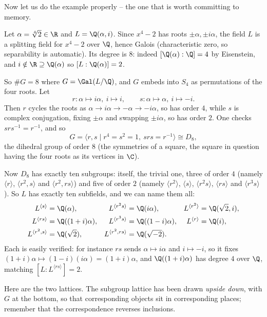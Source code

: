 Now let us do the example properly -- the one that is worth committing to memory.

\begin{example}\label{ex:biglattice}
	Let $\alpha = \sqrt[4]{2} \in \R$ and $L = \Q(\alpha, i)$. Since $x^4 - 2$ has roots $\pm\alpha, \pm i\alpha$, the field $L$ is a splitting field for $x^4-2$ over $\Q$, hence Galois (characteristic zero, so separability is automatic). Its degree is $8$: indeed $[\Q(\alpha):\Q] = 4$ by Eisenstein, and $i \notin \R \supseteq \Q(\alpha)$ so $[L:\Q(\alpha)] = 2$.

	So $\#G = 8$ where $G = \Gal(L/\Q)$, and $G$ embeds into $S_4$ as permutations of the four roots. Let
	$$r : \alpha \mapsto i\alpha,\ i \mapsto i, \qquad s : \alpha\mapsto\alpha,\ i \mapsto -i.$$
	Then $r$ cycles the roots as $\alpha \to i\alpha \to -\alpha \to -i\alpha$, so has order $4$, while $s$ is complex conjugation, fixing $\pm\alpha$ and swapping $\pm i\alpha$, so has order $2$. One checks $srs^{-1} = r^{-1}$, and so
	$$G = \langle r, s \mid r^4 = s^2 = 1,\ srs = r^{-1}\rangle \cong D_8,$$
	the dihedral group of order $8$ (the symmetries of a square, the square in question having the four roots as its vertices in $\C$).

	Now $D_8$ has exactly ten subgroups: itself, the trivial one, three of order $4$ (namely $\langle r\rangle$, $\langle r^2, s\rangle$ and $\langle r^2, rs\rangle$) and five of order $2$ (namely $\langle r^2\rangle$, $\langle s\rangle$, $\langle r^2s\rangle$, $\langle rs\rangle$ and $\langle r^3 s\rangle$). So $L$ has exactly ten subfields, and we can name them all:
	\begin{align*}
		L^{\langle s\rangle} &= \Q(\alpha), & L^{\langle r^2s\rangle} &= \Q(i\alpha), & L^{\langle r^2\rangle} &= \Q(\sqrt2, i),\\
		L^{\langle rs\rangle} &= \Q((1+i)\alpha), & L^{\langle r^3s\rangle} &= \Q((1-i)\alpha), & L^{\langle r\rangle} &= \Q(i),\\
		L^{\langle r^2,s\rangle} &= \Q(\sqrt 2), & L^{\langle r^2, rs\rangle} &= \Q(\sqrt{-2}). &&
	\end{align*}
	Each is easily verified: for instance $rs$ sends $\alpha \mapsto i\alpha$ and $i \mapsto -i$, so it fixes $(1+i)\alpha \mapsto (1-i)(i\alpha) = (1+i)\alpha$, and $\Q((1+i)\alpha)$ has degree $4$ over $\Q$, matching $[L:L^{\langle rs\rangle}] = 2$.

	Here are the two lattices. The subgroup lattice has been drawn \emph{upside down}, with $G$ at the bottom, so that corresponding objects sit in corresponding places; remember that the correspondence reverses inclusions.


\end{example}
